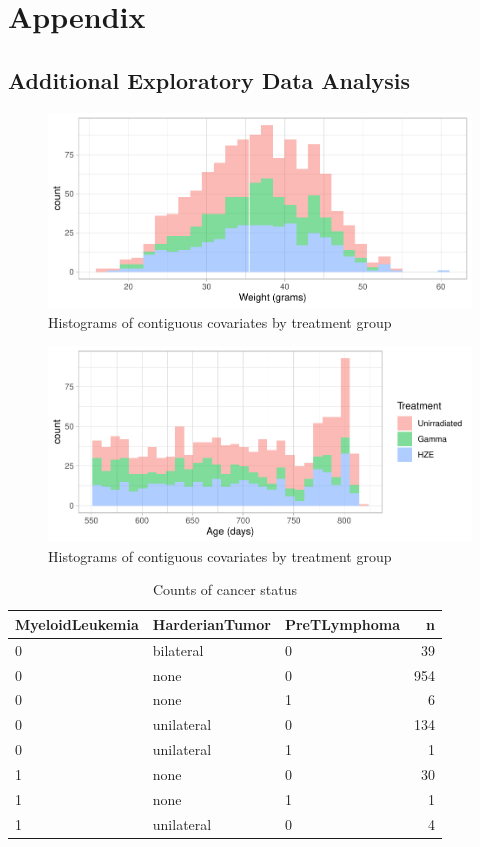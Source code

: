 \documentclass[12pt]{article}
\newlength{\cslhangindent}
\newlength{\cslentryspacingunit} %
\newenvironment{CSLReferences}[2] %
 {%
  \setlength{\parindent}{0pt}
  \ifodd #1
  \let\oldpar\par
  \def\par{\hangindent=\cslhangindent\oldpar}
  \fi
  \setlength{\parskip}{#2\cslentryspacingunit}
 }%
 {}
\begin{document}
\hypertarget{refs}{}
\begin{CSLReferences}{0}{0}
\end{CSLReferences}

\appendix

\section{Appendix}

\hypertarget{additional-exploratory-data-analysis}{%
\subsection{Additional Exploratory Data Analysis}\label{additional-exploratory-data-analysis}}

\label{sec:appeda}

\begin{figure}[H]

{\centering \includegraphics[width=0.42\linewidth]{bookdown_report_files/figure-latex/eda-1} 

}

\caption{Histograms of contiguous covariates by treatment group}\label{fig:eda-1}
\end{figure}
\begin{figure}[H]

{\centering \includegraphics[width=0.42\linewidth]{bookdown_report_files/figure-latex/eda-2} 

}

\caption{Histograms of contiguous covariates by treatment group}\label{fig:eda-2}
\end{figure}

\begin{table}[!h]
\centering
\begin{tabular}{lllr}
  \toprule
MyeloidLeukemia & HarderianTumor & PreTLymphoma & n \\ 
  \midrule
0 & bilateral & 0 &  39 \\ 
  0 & none & 0 & 954 \\ 
  0 & none & 1 &   6 \\ 
  0 & unilateral & 0 & 134 \\ 
  0 & unilateral & 1 &   1 \\ 
  1 & none & 0 &  30 \\ 
  1 & none & 1 &   1 \\ 
  1 & unilateral & 0 &   4 \\ 
   \bottomrule
\end{tabular}
\caption{Counts of cancer status} 
\end{table}
\end{document}
